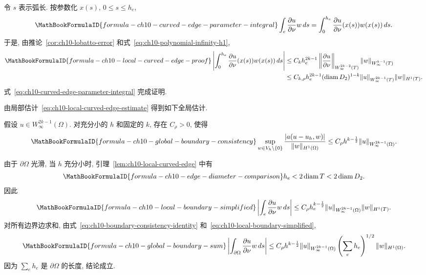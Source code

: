 \begin{Proof}
令 $s$ 表示弧长. 按参数化 $x(s)$, $0\leq s\leq h_e$,
\begin{equation}
\MathBookFormulaID{formula-ch10-curved-edge-parameter-integral}
\label{eq:ch10-curved-edge-parameter-integral}
\int_e\frac{\partial u}{\partial\nu}w\,ds
=\int_0^{h_e}\frac{\partial u}{\partial\nu}(x(s))w(x(s))\,ds.
\end{equation}
于是, 由推论~\ref{cor:ch10-lobatto-error} 和式~\eqref{eq:ch10-polynomial-infinity-h1},
\begin{align*}
\MathBookFormulaID{formula-ch10-local-curved-edge-proof}
\left|\int_0^{h_e}\frac{\partial u}{\partial\nu}(x(s))w(x(s))\,ds\right|
&\leq C_kh_e^{2k-1}
\left\|\frac{\partial u}{\partial\nu}\right\|_{W_\infty^{2k-2}(T)}
\|w\|_{W_\infty^{k-1}(T)}\\
&\leq C_{k,\rho}h_e^{2k-1}(\operatorname{diam}D_2)^{1-k}
\|u\|_{W_\infty^{2k-1}(T)}\|w\|_{H^1(T)}.
\end{align*}
式~\eqref{eq:ch10-curved-edge-parameter-integral} 完成证明.
\end{Proof}

由局部估计~\eqref{eq:ch10-local-curved-edge-estimate} 得到如下全局估计.

\begin{Lemma}
\label{lem:ch10-global-boundary-consistency}
假设 $u\in W_\infty^{2k-1}(\Omega)$. 对充分小的 $h$ 和固定的 $k$, 存在 $C_\rho>0$, 使得
\[
\MathBookFormulaID{formula-ch10-global-boundary-consistency}
\sup_{w\in V_h\setminus\{0\}}
\frac{|a(u-u_h,w)|}{\|w\|_{H^1(\Omega)}}
\leq C_\rho h^{k-\frac12}\|u\|_{W_\infty^{2k-1}(\Omega)}.
\]
\end{Lemma}

\begin{Proof}
由于 $\partial\Omega$ 光滑, 当 $h$ 充分小时, 引理~\ref{lem:ch10-local-curved-edge} 中有
\begin{equation}
\MathBookFormulaID{formula-ch10-edge-diameter-comparison}
\label{eq:ch10-edge-diameter-comparison}
h_e<2\operatorname{diam}T<2\operatorname{diam}D_2.
\end{equation}
因此
\begin{equation}
\MathBookFormulaID{formula-ch10-local-boundary-simplified}
\label{eq:ch10-local-boundary-simplified}
\left|\int_e\frac{\partial u}{\partial\nu}w\,ds\right|
\leq C_\rho h_e^{k-\frac12}\|u\|_{W_\infty^{2k-1}(\Omega)}\|w\|_{H^1(T)}.
\end{equation}
对所有边界边求和, 由式~\eqref{eq:ch10-boundary-consistency-identity} 和~\eqref{eq:ch10-local-boundary-simplified},
\[
\MathBookFormulaID{formula-ch10-global-boundary-sum}
\left|\int_{\partial\Omega}\frac{\partial u}{\partial\nu}w\,ds\right|
\leq C_\rho h^{k-\frac12}\|u\|_{W_\infty^{2k-1}(\Omega)}
\left(\sum_eh_e\right)^{1/2}\|w\|_{H^1(\Omega)}.
\]
因为 $\sum_eh_e$ 是 $\partial\Omega$ 的长度, 结论成立.
\end{Proof}

